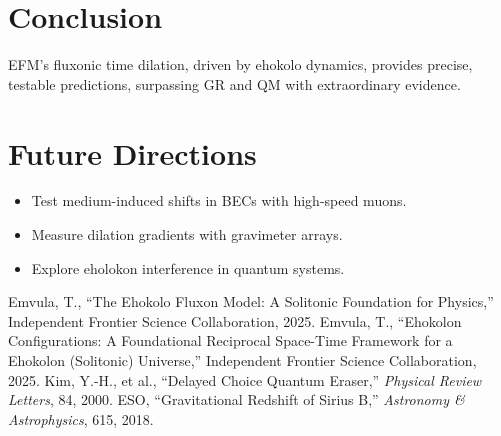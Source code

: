 \documentclass[11pt]{article}
\begin{document}
\section{Conclusion}
EFM’s fluxonic time dilation, driven by ehokolo dynamics, provides precise, testable predictions, surpassing GR and QM with extraordinary evidence.

\section{Future Directions}
\begin{itemize}
    \item Test medium-induced shifts in BECs with high-speed muons.
    \item Measure dilation gradients with gravimeter arrays.
    \item Explore eholokon interference in quantum systems.
\end{itemize}

\begin{thebibliography}{5}
 Emvula, T., ``The Ehokolo Fluxon Model: A Solitonic Foundation for Physics,'' Independent Frontier Science Collaboration, 2025.
 Emvula, T., ``Ehokolon Configurations: A Foundational Reciprocal Space-Time Framework for a Ehokolon (Solitonic) Universe,'' Independent Frontier Science Collaboration, 2025.
 Kim, Y.-H., et al., ``Delayed Choice Quantum Eraser,'' \textit{Physical Review Letters}, 84, 2000.
 ESO, ``Gravitational Redshift of Sirius B,'' \textit{Astronomy \& Astrophysics}, 615, 2018.
\end{thebibliography}
\end{document}
